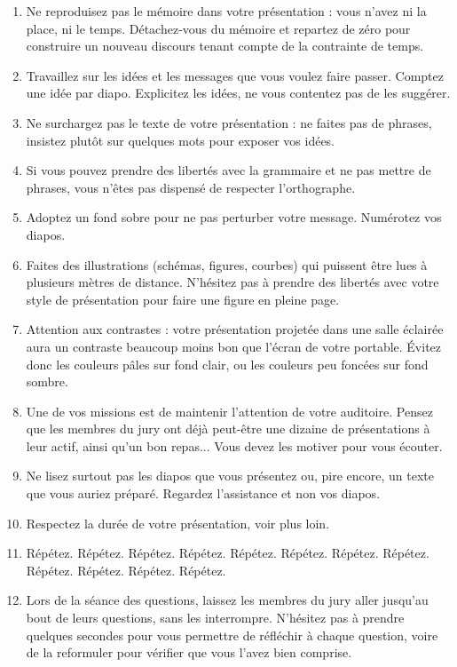 \documentclass [twoside,openright,a4paper,11pt,french] {report}
\begin{document}
\begin {enumerate}
    \item Ne reproduisez pas le mémoire dans votre présentation : vous
	n'avez ni la place, ni le temps. Détachez-vous du mémoire et
	repartez de zéro pour construire un nouveau discours tenant
	compte de la contrainte de temps.

    \item Travaillez sur les idées et les messages que vous voulez
	faire passer. Comptez une idée par diapo. Explicitez les idées,
	ne vous contentez pas de les suggérer.

    \item Ne surchargez pas le texte de votre présentation : ne faites
	pas de phrases, insistez plutôt sur quelques mots pour exposer
	vos idées.

    \item Si vous pouvez prendre des libertés avec la grammaire et
	ne pas mettre de phrases, vous n'êtes pas dispensé de respecter
	l'orthographe.

    \item Adoptez un fond sobre pour ne pas perturber votre message.
	Numérotez vos diapos.

    \item Faites des illustrations (schémas, figures, courbes) qui
	puissent être lues à plusieurs mètres de distance. N'hésitez
	pas à prendre des libertés avec votre style de présentation
	pour faire une figure en pleine page.

    \item Attention aux contrastes : votre présentation projetée dans
	une salle éclairée aura un contraste beaucoup moins bon que
	l'écran de votre portable. Évitez donc les couleurs pâles
	sur fond clair, ou les couleurs peu foncées sur fond sombre.

    \item Une de vos missions est de maintenir l'attention de votre
	auditoire. Pensez que les membres du jury ont déjà peut-être
	une dizaine de présentations à leur actif, ainsi qu'un bon
	repas... Vous devez les motiver pour vous écouter.

    \item Ne lisez surtout pas les diapos que vous présentez ou, pire
	encore, un texte que vous auriez préparé. Regardez l'assistance
	et non vos diapos.

    \item Respectez la durée de votre présentation, voir plus loin.

    \item Répétez. Répétez. Répétez. Répétez. Répétez. Répétez.
	Répétez. Répétez. Répétez. Répétez. Répétez. Répétez.

    \item Lors de la séance des questions, laissez les membres du jury
	aller jusqu'au bout de leurs questions, sans les
	interrompre. N'hésitez pas à prendre quelques secondes pour
	vous permettre de réfléchir à chaque question, voire de la
	reformuler pour vérifier que vous l'avez bien comprise.

\end {enumerate}
\end{document}
